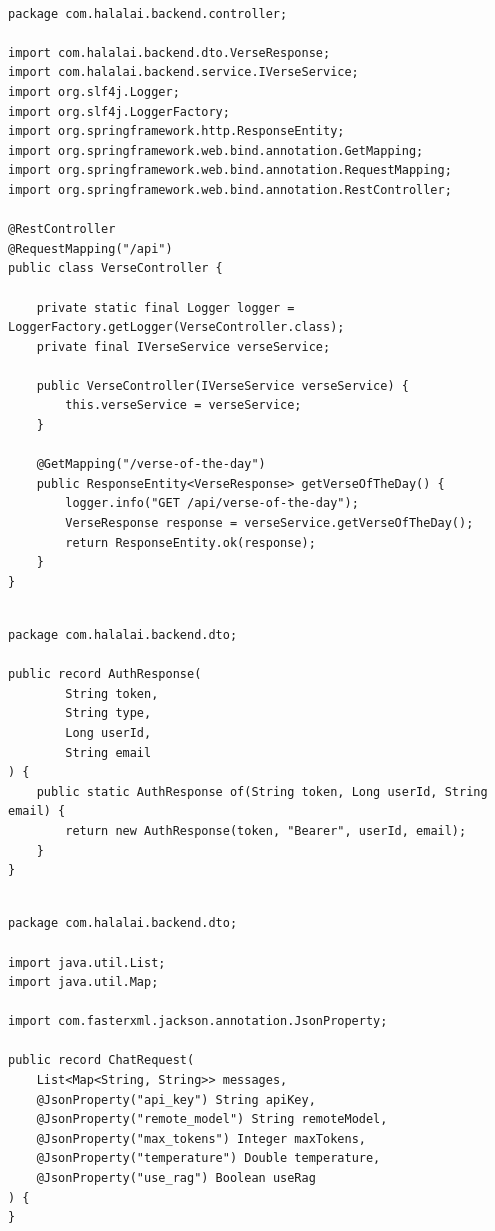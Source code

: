 \begin{lstlisting}[basicstyle=\tiny\ttfamily,breaklines=true]

package com.halalai.backend.controller;

import com.halalai.backend.dto.VerseResponse;
import com.halalai.backend.service.IVerseService;
import org.slf4j.Logger;
import org.slf4j.LoggerFactory;
import org.springframework.http.ResponseEntity;
import org.springframework.web.bind.annotation.GetMapping;
import org.springframework.web.bind.annotation.RequestMapping;
import org.springframework.web.bind.annotation.RestController;

@RestController
@RequestMapping("/api")
public class VerseController {

    private static final Logger logger = LoggerFactory.getLogger(VerseController.class);
    private final IVerseService verseService;

    public VerseController(IVerseService verseService) {
        this.verseService = verseService;
    }

    @GetMapping("/verse-of-the-day")
    public ResponseEntity<VerseResponse> getVerseOfTheDay() {
        logger.info("GET /api/verse-of-the-day");
        VerseResponse response = verseService.getVerseOfTheDay();
        return ResponseEntity.ok(response);
    }
}
\end{lstlisting}

\begin{lstlisting}[basicstyle=\tiny\ttfamily,breaklines=true]

package com.halalai.backend.dto;

public record AuthResponse(
        String token,
        String type,
        Long userId,
        String email
) {
    public static AuthResponse of(String token, Long userId, String email) {
        return new AuthResponse(token, "Bearer", userId, email);
    }
}
\end{lstlisting}

\begin{lstlisting}[basicstyle=\tiny\ttfamily,breaklines=true]

package com.halalai.backend.dto;

import java.util.List;
import java.util.Map;

import com.fasterxml.jackson.annotation.JsonProperty;

public record ChatRequest(
    List<Map<String, String>> messages,
    @JsonProperty("api_key") String apiKey,
    @JsonProperty("remote_model") String remoteModel,
    @JsonProperty("max_tokens") Integer maxTokens,
    @JsonProperty("temperature") Double temperature,
    @JsonProperty("use_rag") Boolean useRag
) {
}
\end{lstlisting}

